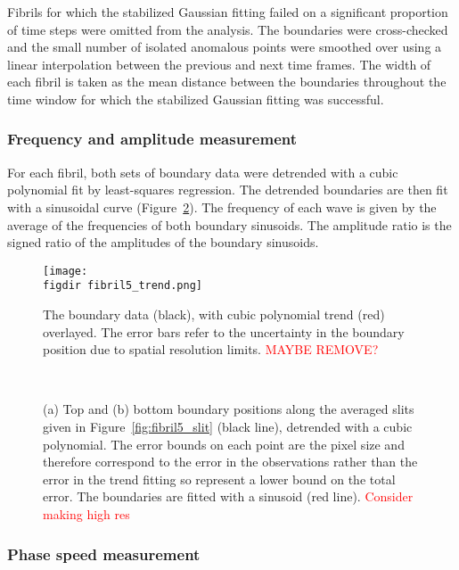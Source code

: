 \documentclass[12pt]{../style-files/ociamthesis}
\newcommand{\figdir}{../main/figures/chpt-4/} %
\begin{document}
Fibrils for which the stabilized Gaussian fitting failed on a significant proportion of time steps were omitted from the analysis. The boundaries were cross-checked and the small number of isolated anomalous points were smoothed over using a linear interpolation between the previous and next time frames. The width of each fibril is taken as the mean distance between the boundaries throughout the time window for which the stabilized Gaussian fitting was successful.


\subsubsection{Frequency and amplitude measurement} \label{sec:freq amp}
For each fibril, both sets of boundary data were detrended with a cubic polynomial fit by least-squares regression. The detrended boundaries are then fit with a sinusoidal curve (Figure~\ref{fig:fibril5_detrend}). The frequency of each wave is given by the average of the frequencies of both boundary sinusoids. The amplitude ratio is the signed ratio of the amplitudes of the boundary sinusoids.

\begin{figure}
\centering
\texttt{[image: \\figdir fibril5\_trend.png]}
\caption{The boundary data (black), with cubic polynomial trend (red) overlayed. The error bars refer to the uncertainty in the boundary position due to spatial resolution limits. \textcolor{red}{MAYBE REMOVE?}}
\label{fig:fibril5_trend}
\end{figure}

\begin{figure}
	\centering
	 \\
	\caption{(a) Top and (b) bottom boundary positions along the averaged slits given in Figure~\ref{fig:fibril5_slit} (black line), detrended with a cubic polynomial. The error bounds on each point are the pixel size and therefore correspond to the error in the observations rather than the error in the trend fitting so represent a lower bound on the total error. The boundaries are fitted with a sinusoid (red line). \textcolor{red}{Consider making high res}}
	\label{fig:fibril5_detrend}
\end{figure}


\subsubsection{Phase speed measurement} \label{sec:phase speed}
\end{document}
